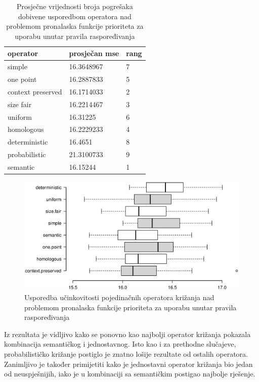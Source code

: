 \begin{table}[H]
 	\centering

    \begin{tabular}{| l | l | l |}
    \hline
    \textbf{operator} & \textbf{prosječan mse} & \textbf{rang}\\ \hline
    simple & 16.3648967 & 7\\ \hline
    one point & 16.2887833 & 5\\ \hline
    context preserved & 16.1714033 & 2\\ \hline
    size fair & 16.2214467 & 3\\ \hline
    uniform & 16.31225 & 6\\ \hline
    homologous & 16.2229233 & 4\\ \hline
    deterministic & 16.4651 & 8\\ \hline
    probabilistic & 21.3100733 & 9\\ \hline
    semantic & 16.15244 & 1\\ \hline
    \end{tabular}
    
    \caption{Prosječne vrijednosti broja pogrešaka dobivene usporedbom operatora nad problemom pronalaska funkcije prioriteta za uporabu unutar pravila raspoređivanja}
    \label{iprojekttable}
\end{table}

\begin{figure}[H]
	\centering
	\includegraphics[trim=2cm 4cm 2cm 3cm, scale=0.6]{./slike/boxPlots/iprojekt.eps}
	\caption{Usporedba učinkovitosti pojedinačnih operatora križanja nad problemom pronalaska funkcije prioriteta za uporabu unutar pravila raspoređivanja}
	\label{iprojektBox}
\end{figure}

Iz rezultata je vidljivo kako se ponovno kao najbolji operator križanja pokazala kombinacija semantičkog i jednostavnog. Isto kao i za prethodne slučajeve, probabilističko križanje postiglo je znatno lošije rezultate od ostalih operatora. Zanimljivo je također primijetiti kako je jednostavni operator križanja bio jedan od neuspješnijih, iako je u kombinaciji sa semantičkim postigao najbolje rješenje.

